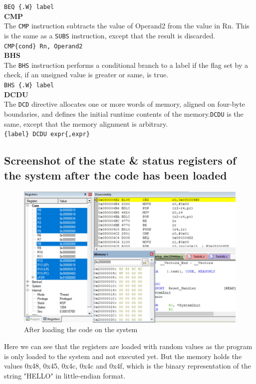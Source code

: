 \documentclass[footheight=20pt, footsepline, headheight=20pt, headsepline]{scrartcl}
\begin{document}
\verb|BEQ {.W} label|\\
\textbf{CMP}\\
The \verb|CMP| instruction subtracts the value of Operand2 from the value in Rn. This is the same as a \verb|SUBS| instruction, except that the result is discarded.\\
\verb|CMP{cond} Rn, Operand2|\\
\textbf{BHS}\\
The \verb|BHS| instruction performs a conditional branch to a label if the flag set by a check, if an unsigned value is greater or same, is true.\\
\verb|BHS {.W} label|\\
\textbf{DCDU}\\
The \verb|DCD| directive allocates one or more words of memory, aligned on four-byte boundaries, and defines the initial runtime contents of the memory.\verb|DCDU| is the same, except that the memory alignment is arbitrary.\\
\verb|{label} DCDU expr{,expr}|\\


\FloatBarrier
\subsection*{Screenshot of the state \& status registers of the system after the code has been loaded}
\begin{figure}[ht]
    \centering
    \includegraphics[scale=.7]{images/Task4b_Before1.jpg}
    \caption{After loading the code on the system}
    \label{fig:before_task_4b}
\end{figure}
\FloatBarrier
Here we can see that the registers are loaded with random values as the program is only loaded to the system and not executed yet. But the memory holds the values 0x48, 0x45, 0x4c, 0x4c and 0x4f, which is the binary representation of the string "HELLO" in little-endian format.
\end{document}

